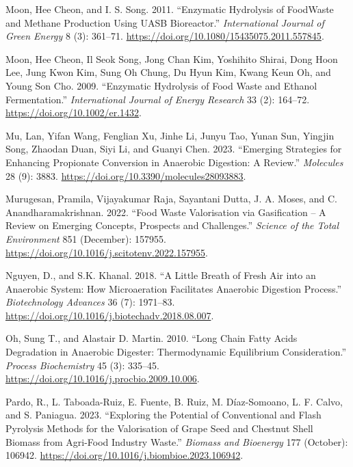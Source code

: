 \documentclass[11pt]{report}
\begin{document}
\begin{hangparas}{1.5em}{1}
\hypertarget{citeproc_bib_item_39}{Moon, Hee Cheon, and I. S. Song. 2011. “Enzymatic Hydrolysis of FoodWaste and Methane Production Using UASB Bioreactor.” \textit{International Journal of Green Energy} 8 (3): 361–71. \url{https://doi.org/10.1080/15435075.2011.557845}.}

\hypertarget{citeproc_bib_item_40}{Moon, Hee Cheon, Il Seok Song, Jong Chan Kim, Yoshihito Shirai, Dong Hoon Lee, Jung Kwon Kim, Sung Oh Chung, Du Hyun Kim, Kwang Keun Oh, and Young Son Cho. 2009. “Enzymatic Hydrolysis of Food Waste and Ethanol Fermentation.” \textit{International Journal of Energy Research} 33 (2): 164–72. \url{https://doi.org/10.1002/er.1432}.}

\hypertarget{citeproc_bib_item_41}{Mu, Lan, Yifan Wang, Fenglian Xu, Jinhe Li, Junyu Tao, Yunan Sun, Yingjin Song, Zhaodan Duan, Siyi Li, and Guanyi Chen. 2023. “Emerging Strategies for Enhancing Propionate Conversion in Anaerobic Digestion: A Review.” \textit{Molecules} 28 (9): 3883. \url{https://doi.org/10.3390/molecules28093883}.}

\hypertarget{citeproc_bib_item_42}{Murugesan, Pramila, Vijayakumar Raja, Sayantani Dutta, J. A. Moses, and C. Anandharamakrishnan. 2022. “Food Waste Valorisation via Gasification – A Review on Emerging Concepts, Prospects and Challenges.” \textit{Science of the Total Environment} 851 (December): 157955. \url{https://doi.org/10.1016/j.scitotenv.2022.157955}.}

\hypertarget{citeproc_bib_item_43}{Nguyen, D., and S.K. Khanal. 2018. “A Little Breath of Fresh Air into an Anaerobic System: How Microaeration Facilitates Anaerobic Digestion Process.” \textit{Biotechnology Advances} 36 (7): 1971–83. \url{https://doi.org/10.1016/j.biotechadv.2018.08.007}.}

\hypertarget{citeproc_bib_item_44}{Oh, Sung T., and Alastair D. Martin. 2010. “Long Chain Fatty Acids Degradation in Anaerobic Digester: Thermodynamic Equilibrium Consideration.” \textit{Process Biochemistry} 45 (3): 335–45. \url{https://doi.org/10.1016/j.procbio.2009.10.006}.}

\hypertarget{citeproc_bib_item_45}{Pardo, R., L. Taboada-Ruiz, E. Fuente, B. Ruiz, M. Díaz-Somoano, L. F. Calvo, and S. Paniagua. 2023. “Exploring the Potential of Conventional and Flash Pyrolysis Methods for the Valorisation of Grape Seed and Chestnut Shell Biomass from Agri-Food Industry Waste.” \textit{Biomass and Bioenergy} 177 (October): 106942. \url{https://doi.org/10.1016/j.biombioe.2023.106942}.}


\end{hangparas}
\end{document}
